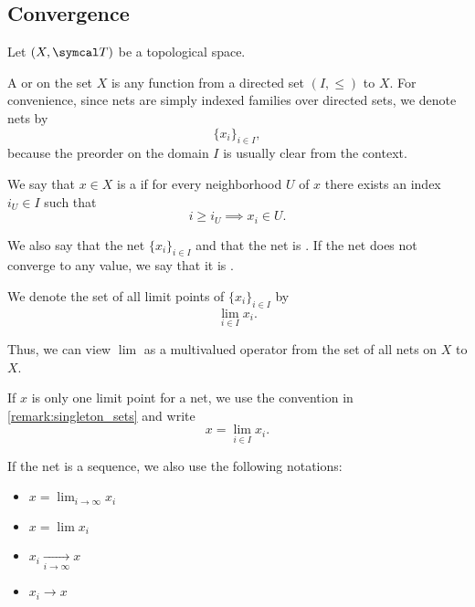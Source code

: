 \subsection{Convergence}\label{subsec:convergence}

Let \( (X, \Cal{T}) \) be a topological space.

\begin{definition}\label{def:topological_net}\cite[49]{Engelking1989}
  A  or  on the set \( X \) is any function from a directed set \( (I, \leq) \) to \( X \). For convenience, since nets are simply indexed families over directed sets, we denote nets by
  \begin{equation*}
    \{ x_i \}_{i \in I},
  \end{equation*}
  because the preorder on the domain \( I \) is usually clear from the context.
\end{definition}

\begin{definition}\label{def:net_limit_point}\cite[49]{Engelking1989}
  We say that \( x \in X \) is a  if for every neighborhood \( U \) of \( x \) there exists an index \( i_U \in I \) such that
  \begin{equation*}
    i \geq i_U \implies x_i \in U.
  \end{equation*}

  We also say that the net \( \{ x_i \}_{i \in I} \)  and that the net is . If the net does not converge to any value, we say that it is .

  We denote the set of all limit points of \( \{ x_i \}_{i \in I} \) by
  \begin{equation*}
    \lim_{i \in I} x_i.
  \end{equation*}

  Thus, we can view \( \lim \) as a multivalued operator from the set of all nets on \( X \) to \( X \).

  If \( x \) is only one limit point for a net, we use the convention in \cref{remark:singleton_sets} and write
  \begin{equation*}
    x = \lim_{i \in I} x_i.
  \end{equation*}

  If the net is a sequence, we also use the following notations:
  \begin{itemize}
    \item \( x = \lim_{i \to \infty} x_i \)
    \item \( x = \lim x_i \)
    \item \( x_i \xrightarrow[i \to \infty]{} x \)
    \item \( x_i \to x \)
  \end{itemize}
\end{definition}

